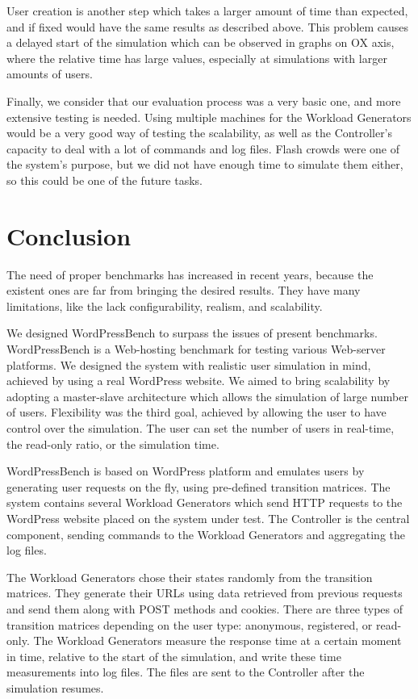 User creation is another step which takes a larger amount of time than expected, and if fixed would have the same results as described above. This problem causes a delayed start of the simulation which can be observed in graphs on OX axis, where the relative time has large values, especially at simulations with larger amounts of users.

Finally, we consider that our evaluation process was a very basic one, and more extensive testing is needed. Using multiple machines for the Workload Generators would be a very good way of testing the scalability, as well as the Controller's capacity to deal with a lot of commands and log files. Flash crowds were one of the system's purpose, but we did not have enough time to simulate them either, so this could be one of the future tasks.

\section{Conclusion}
\label{sec:system-architecture}

The need of proper benchmarks has increased in recent years, because the existent ones are far from bringing the desired results. They have many limitations, like the lack configurability, realism, and scalability.

We designed WordPressBench to surpass the issues of present benchmarks. WordPressBench is a Web-hosting benchmark for testing various Web-server platforms. We designed the system with realistic user simulation in mind, achieved by using a real WordPress website. We aimed to bring scalability by adopting a master-slave architecture which allows the simulation of large number of users. Flexibility was the third goal, achieved by allowing the user to have control over the simulation. The user can set the number of users in real-time, the read-only ratio, or the simulation time.

WordPressBench is based on WordPress platform and emulates users by generating user requests on the fly, using pre-defined transition matrices. The system contains several Workload Generators which send HTTP requests to the WordPress website placed on the system under test. The Controller is the central component, sending commands to the Workload Generators and aggregating the log files.

The Workload Generators chose their states randomly from the transition matrices. They generate their URLs using data retrieved from previous requests and send them along with POST methods and cookies. There are three types of transition matrices depending on the user type: anonymous, registered, or read-only. The Workload Generators measure the response time at a certain moment in time, relative to the start of the simulation, and write these time measurements into log files. The files are sent to the Controller after the simulation resumes.


